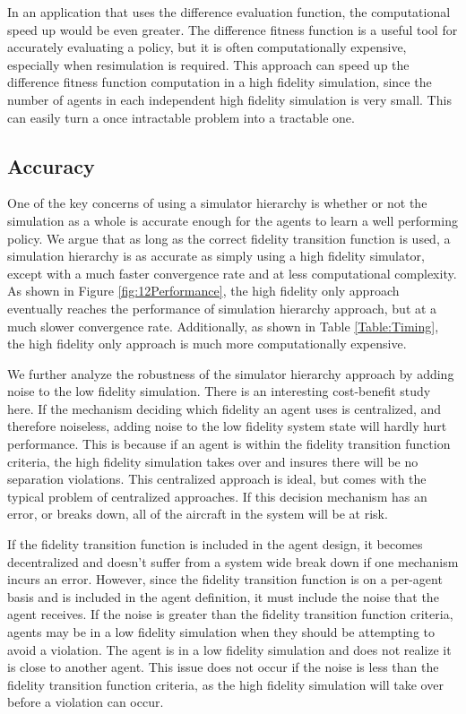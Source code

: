 \documentclass{sig-alternate}
\begin{document}
In an application that uses the difference evaluation function, the computational speed up would be even greater. The difference fitness function is a useful tool for accurately evaluating a policy, but it is often computationally expensive, especially when resimulation is required. This approach can speed up the difference fitness function computation in a high fidelity simulation, since the number of agents in each independent high fidelity simulation is very small. This can easily turn a once intractable problem into a tractable one.

\vspace{10mm}
\subsection{Accuracy}

One of the key concerns of using a simulator hierarchy is whether or not the simulation as a whole is accurate enough for the agents to learn a well performing policy. We argue that as long as the correct fidelity transition function is used, a simulation hierarchy is as accurate as simply using a high fidelity simulator, except with a much faster convergence rate and at less computational complexity. As shown in Figure \ref{fig:12Performance}, the high fidelity only approach eventually reaches the performance of simulation hierarchy approach, but at a much slower convergence rate. Additionally, as shown in Table \ref{Table:Timing}, the high fidelity only approach is much more computationally expensive. 

We further analyze the robustness of the simulator hierarchy approach by adding noise to the low fidelity simulation. There is an interesting cost-benefit study here. If the mechanism deciding which fidelity an agent uses is centralized, and therefore noiseless, adding noise to the low fidelity system state will hardly hurt performance. This is because if an agent is within the fidelity transition function criteria, the high fidelity simulation takes over and insures there will be no separation violations. This centralized approach is ideal, but comes with the typical problem of centralized approaches. If this decision mechanism has an error, or breaks down, all of the aircraft in the system will be at risk. 

If the fidelity transition function is included in the agent design, it becomes decentralized and doesn't suffer from a system wide break down if one mechanism incurs an error. However, since the fidelity transition function is on a per-agent basis and is included in the agent definition, it must include the noise that the agent receives. If the noise is greater than the fidelity transition function criteria, agents may be in a low fidelity simulation when they should be attempting to avoid a violation. The agent is in a low fidelity simulation and does not realize it is close to another agent. This issue does not occur if the noise is less than the fidelity transition function criteria, as the high fidelity simulation will take over before a violation can occur.
\end{document}
